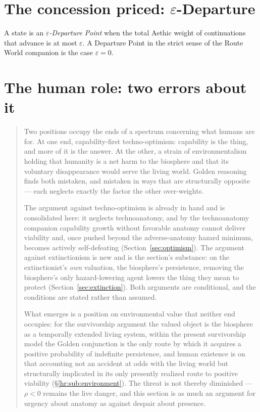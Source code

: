 \section{The concession priced: \texorpdfstring{$\varepsilon$}{epsilon}-Departure}\label{sec:epsilon}

\begin{definition}\label{gc:def:epsdep}
A state is an \emph{$\varepsilon$-Departure Point} when the total
Aethic weight of continuations that advance is at most $\varepsilon$. A
Departure Point in the strict sense of
the Route World companion \cite{GoldenRouteWorld} is the case $\varepsilon=0$.
\end{definition}

\section{The human role: two errors about it}\label{sec:errors}


\begin{quote}\small
Two positions occupy the ends of a spectrum concerning what humans are
for. At one end, capability-first techno-optimism: capability is the
thing, and more of it is the answer. At the other, a strain of environmentalism holding
that humanity is a net harm to the biosphere and that its voluntary
disappearance would serve the living world. Golden reasoning finds both
mistaken, and mistaken in ways that are structurally opposite --- each
neglects exactly the factor the other over-weights.

The argument against techno-optimism is already in hand and is
consolidated here: it neglects technoanatomy, and by
the technoanatomy companion \cite{GoldenTechnoanatomy} capability growth without favorable
anatomy cannot deliver viability and, once pushed beyond the
adverse-anatomy hazard minimum, becomes actively self-defeating
(Section~\ref{sec:optimism}). The argument against extinctionism is new and
is the section's substance: on the extinctionist's \emph{own} valuation, the biosphere's persistence, removing the biosphere's only
hazard-lowering agent lowers the thing they mean to protect
(Section~\ref{sec:extinction}). Both arguments are conditional, and the
conditions are stated rather than assumed.

What emerges is a position on environmental value that neither end
occupies: for the survivorship argument the valued object is the
biosphere as a temporally extended living system, within the present survivorship model the Golden conjunction is
the only route by which it acquires a positive probability of
indefinite persistence, and human
existence is on that accounting not an accident at odds with the living
world but structurally implicated in its only presently realized route
to positive viability
(\S\ref{hr:sub:environment}). The threat is not thereby diminished ---
$\rho<0$ remains the live danger, and this section is as much an
argument for urgency about anatomy as against despair about presence.
\end{quote}





